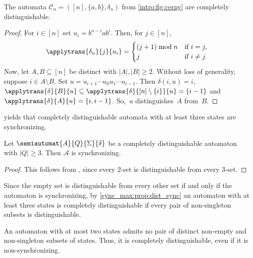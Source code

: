 \begin{theorem}
	\label{sync_max:thm:cerny_compl_dist}
	The \Cerny automata $\mathcal C_n = ([n], \{a,b\}, \delta_n)$ from \cref{intro:fig:cerny}
	are completely distinguishable.
\end{theorem}
\begin{proof}
For $i \in [n]$ 
set $u_i = b^{n - i} a b^i$.
Then, for $j \in [n]$,
\begin{equation} \label{sync_max:thm:cerny_compl_dist:eqn}
\applytrans{\delta_n}{j}{u_i} = \begin{cases}
	(j + 1 ) \bmod n & \text{if } i = j, \\
	j             & \text{if } i \ne j.	
\end{cases}
\end{equation}
Now, let $A, B \subseteq [n]$ be distinct with $|A|, |B| \ge 2$. %
Without loss of generality, 
suppose $i \in A \setminus B$. Set $u = u_{i+1} \cdots u_0 u_1 \cdots u_{i-1}$.
Then $\delta(i, u) = i$, $\applytrans{\delta}{B}{u} \subseteq \applytrans{\delta}{[n] \setminus \{i\}}{u} = \{ i - 1 \}$
and $\applytrans{\delta}{A}{u} = \{i,i-1\}$. So,~$u$
distinguishes~$A$ from~$B$.
\end{proof} %

 yields
that completely distinguishable automata with at least three states are synchronizing.

\begin{proposition}
	\label{sync_max:prop:dist_sync}
	Let $\semiautomat{A}{Q}{\Sigma}{\delta}$ 
	be a completely distinguishable automaton
	with $|Q| \ge 3$. Then $\mathcal A$
	is synchronizing.
\end{proposition} 
\begin{proof}
	This follows from ,
	since every $2$-set is distinguishable from every $3$-set.
\end{proof}

Since the empty set is distinguishable from every other set if and only if 
the automaton is synchronizing, by \cref{sync_max:prop:dist_sync}
an automaton with at least three states is completely distinguishable if every pair 
of non-singleton subsets is distinguishable.

\begin{remark}\label{syncmax:rem:two-state-compl-dist}
	An automaton with at most two states admits no pair of distinct non-empty
	and non-singleton subsets of states. Thus, it is
	completely distinguishable, even if it is non-synchronizing.	
\end{remark}

